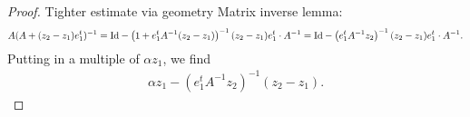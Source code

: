 \documentclass[10pt,a4paper]{article}
\newcommand{\mwl}[1]{{\color{red}#1}}
\begin{document}
\begin{proof}
    \color{Mulberry}
    \mwl{Tighter estimate via geometry}
    Matrix inverse lemma:
    \begin{align*}
        A ( A + (z_2-z_1) e_1^t )^{-1}
        =
        {\rm Id}
        - 
        \left( 1 + e_1^{t} A^{-1} (z_2-z_1) \right)^{-1}
        (z_2-z_1) e_1^t \cdot A^{-1}
        =
        {\rm Id}
        - 
        \left( e_1^{t} A^{-1} z_2 \right)^{-1}
        (z_2-z_1) e_1^t \cdot A^{-1}
        .
    \end{align*}
    Putting in a multiple of $\alpha z_1$, we find 
    \begin{align*}
        \alpha z_1
        -
        \left( e_1^{t} A^{-1} z_2 \right)^{-1}
        (z_2-z_1) 
        .
    \end{align*}


\end{proof}
\end{document}
